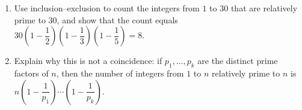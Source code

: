 \begin{enumerate}
\item[(a)] Use inclusion--exclusion to count the integers from $1$ to $30$ that are relatively prime to $30$, and show that the count equals $30\left(1-\dfrac12\right)\left(1-\dfrac13\right)\left(1-\dfrac15\right)=8$.
\item[(b)] Explain why this is not a coincidence: if $p_1,\dots,p_k$ are the distinct prime factors of $n$, then the number of integers from $1$ to $n$ relatively prime to $n$ is $n\left(1-\dfrac{1}{p_1}\right)\cdots\left(1-\dfrac{1}{p_k}\right)$.
\end{enumerate}
